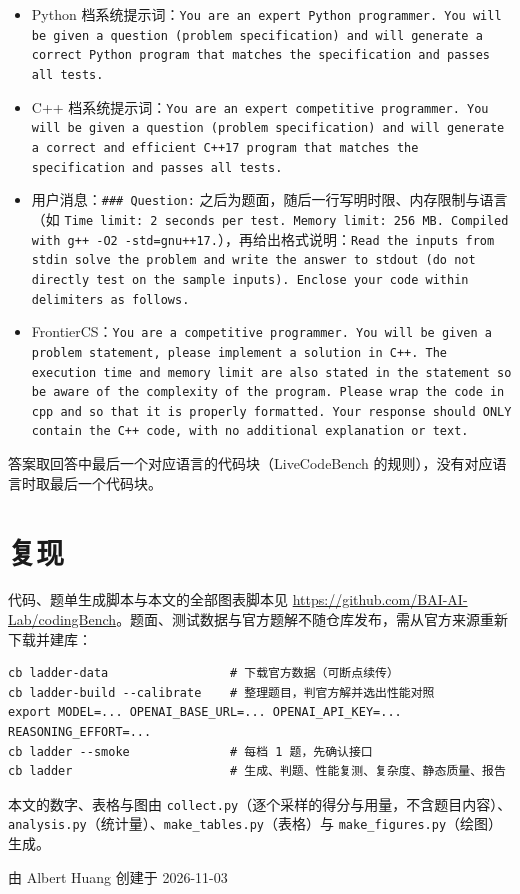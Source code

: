 \documentclass[11pt,a4paper,fontset=none]{ctexart}
\begin{document}
{\raggedright
\begin{itemize}[leftmargin=1.6em]
  \item Python 档系统提示词：\texttt{You are an expert Python programmer. You will be given a question (problem specification) and will generate a correct Python program that matches the specification and passes all tests.}
  \item C++ 档系统提示词：\texttt{You are an expert competitive programmer. You will be given a question (problem specification) and will generate a correct and efficient C++17 program that matches the specification and passes all tests.}
  \item 用户消息：\texttt{\#\#\# Question:} 之后为题面，随后一行写明时限、内存限制与语言（如 \texttt{Time limit: 2 seconds per test. Memory limit: 256 MB. Compiled with g++ -O2 -std=gnu++17.}），再给出格式说明：\texttt{Read the inputs from stdin solve the problem and write the answer to stdout (do not directly test on the sample inputs). Enclose your code within delimiters as follows.}
  \item FrontierCS：\texttt{You are a competitive programmer. You will be given a problem statement, please implement a solution in C++. The execution time and memory limit are also stated in the statement so be aware of the complexity of the program. Please wrap the code in \textasciigrave\textasciigrave\textasciigrave cpp and \textasciigrave\textasciigrave\textasciigrave{} so that it is properly formatted. Your response should ONLY contain the C++ code, with no additional explanation or text.}
\end{itemize}
}

答案取回答中最后一个对应语言的代码块（LiveCodeBench 的规则），没有对应语言时取最后一个代码块。

\section{复现}
\label{app:repro}

代码、题单生成脚本与本文的全部图表脚本见 \url{https://github.com/BAI-AI-Lab/codingBench}。题面、测试数据与官方题解不随仓库发布，需从官方来源重新下载并建库：

{\small
\begin{verbatim}
cb ladder-data                 # 下载官方数据（可断点续传）
cb ladder-build --calibrate    # 整理题目，判官方解并选出性能对照
export MODEL=... OPENAI_BASE_URL=... OPENAI_API_KEY=... REASONING_EFFORT=...
cb ladder --smoke              # 每档 1 题，先确认接口
cb ladder                      # 生成、判题、性能复测、复杂度、静态质量、报告
\end{verbatim}
}

本文的数字、表格与图由 \texttt{collect.py}（逐个采样的得分与用量，不含题目内容）、\texttt{analysis.py}（统计量）、\texttt{make\_tables.py}（表格）与 \texttt{make\_figures.py}（绘图）生成。

\vspace{2em}\begin{flushright}由 Albert Huang 创建于 2026-11-03\end{flushright}
\end{document}
